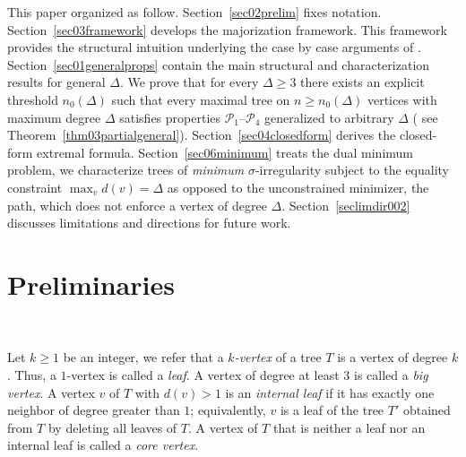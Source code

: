 \documentclass[12pt]{amsart}
\begin{document}
This paper organized as follow. 
Section~\ref{sec02prelim} fixes notation. Section~\ref{sec03framework} develops
the majorization framework. 
This framework provides the structural intuition underlying the case by case arguments of \cite{DimitrovPaper2025}. 
Section~\ref{sec01generalprops} contain the main structural and characterization results for general $\Delta$. 
We prove that for every $\Delta\geqslant 3$ there exists an explicit threshold $n_0(\Delta)$ such that every maximal tree on $n\geqslant n_0(\Delta)$ vertices with maximum  degree $\Delta$ satisfies properties $\mathcal P_1$--$\mathcal P_4$ generalized to arbitrary $\Delta$ ( see Theorem~\ref{thm03partialgeneral}).
Section~\ref{sec04closedform} derives the
closed-form extremal formula. Section~\ref{sec06minimum} treats the dual minimum problem, we characterize trees of \emph{minimum} $\sigma$-irregularity subject to the equality constraint $\max_v d(v)=\Delta$ as opposed to the unconstrained   minimizer, the path, which does not enforce a vertex of degree $\Delta$.
Section~\ref{seclimdir002} discusses limitations and directions for future work.
 


\section{Preliminaries}~\label{sec02prelim}

Let  $k\geqslant  1$ be an integer, we refer that a \emph{$k$-vertex} of a tree $T$ is a vertex of degree $k$. Thus, a $1$-vertex is called a \emph{leaf}. A vertex of degree
at least $3$ is called a \emph{big vertex}. A vertex $v$ of $T$ with $d(v)>1$ is
an \emph{internal leaf} if it has exactly one neighbor of degree greater than
$1$; equivalently, $v$ is a leaf of the tree $T'$ obtained from $T$ by deleting
all leaves of $T$. A vertex of $T$ that is neither a leaf nor an internal leaf
is called a \emph{core vertex}.

\end{document}

